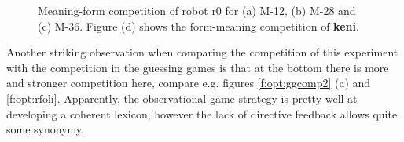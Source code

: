 \begin{figure}[t]
\centering
{}
\caption{Meaning-form competition of robot r0 for (a) M-12, (b) M-28 and (c) M-36. Figure (d) shows the form-meaning competition of {\bf keni}.}
\label{f:opt:cfoli}
\end{figure}


Another striking observation when comparing the competition of this experiment with the competition in the guessing games is that at the bottom there is more and stronger competition here, compare e.g. figures \ref{f:opt:ggcomp2} (a) and \ref{f:opt:rfoli}. Apparently, the observational game strategy is pretty well at developing a coherent lexicon, however the lack of directive feedback allows quite some synonymy. 

